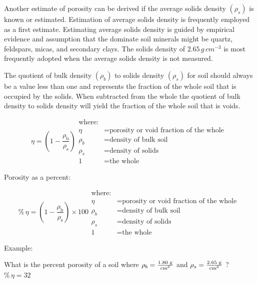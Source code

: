 \documentclass[a5paper]{report}
\begin{document}
Another estimate of porosity can be derived if the average solids density $\left(\rho_s\right)$ is known or estimated. Estimation of average solids density is frequently employed as a first estimate. Estimating average solids density is guided by empirical evidence and assumption that the dominate soil minerals might be quartz, feldspars, micas, and secondary clays. The solids density of $2.65\,g\,cm^{-3}$ is most frequently adopted when the average solids density is not measured.

The quotient of bulk density $\left(\rho_b\right)$ to solids density $\left(\rho_s\right)$ for soil should always be a value less than one and represents the fraction of the whole soil that is occupied by the solids. When subtracted from the whole the quotient of bulk density to solids density will yield the fraction of the whole soil that is voids.

\begin{equation}
    \eta =\left(1-\frac{\rho_{\text{b}}}{\rho_{\text{s}}}\right)
    \begin{aligned}
        \text{where:}\\
        \eta &= \text{porosity or void fraction of the whole }\\
        \rho_b &= \text{density of bulk soil}\\
        \rho_s &= \text{density of solids}\\
        1 &= \text{the whole}
    \end{aligned}
\end{equation}

Porosity as a percent:

\begin{equation}
    \%\,\eta =\left(1-\frac{\rho_{\text{b}}}{\rho_{\text{s}}}\right) \times 100
    \begin{aligned}
        \text{where:}\\
        \eta &= \text{porosity or void fraction of the whole }\\
        \rho_b &= \text{density of bulk soil}\\
        \rho_s &= \text{density of solids}\\
        1 &= \text{the whole}
    \end{aligned}
\end{equation}

Example:

What is the percent porosity of a soil where $\rho_b = \ce{\frac{1.80\,g}{cm^3}}$ and $\rho_s = \ce{\frac{2.65\,g}{cm^3}}$ ? $\%\,\eta = 32$
\end{document}
